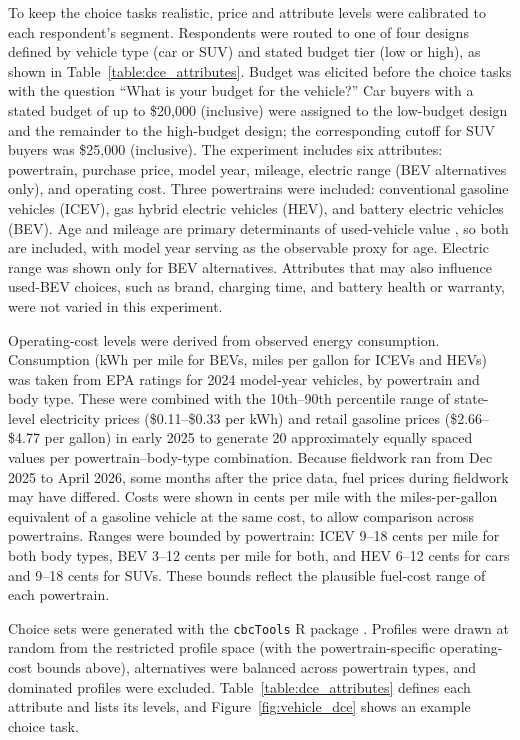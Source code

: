 \documentclass[a4paper,fleqn]{cas-sc}   %
\begin{document}
To keep the choice tasks realistic, price and attribute levels were calibrated to each respondent's segment. Respondents were routed to one of four designs defined by vehicle type (car or SUV) and stated budget tier (low or high), as shown in Table~\ref{table:dce_attributes}. Budget was elicited before the choice tasks with the question ``What is your budget for the vehicle?'' Car buyers with a stated budget of up to \$20,000 (inclusive) were assigned to the low-budget design and the remainder to the high-budget design; the corresponding cutoff for SUV buyers was \$25,000 (inclusive). The experiment includes six attributes: powertrain, purchase price, model year, mileage, electric range (BEV alternatives only), and operating cost. Three powertrains were included: conventional gasoline vehicles (ICEV), gas hybrid electric vehicles (HEV), and battery electric vehicles (BEV). Age and mileage are primary determinants of used-vehicle value \parencite{prieto2015}, so both are included, with model year serving as the observable proxy for age. Electric range was shown only for BEV alternatives. Attributes that may also influence used-BEV choices, such as brand, charging time, and battery health or warranty, were not varied in this experiment.

Operating-cost levels were derived from observed energy consumption. Consumption (kWh per mile for BEVs, miles per gallon for ICEVs and HEVs) was taken from EPA ratings for 2024 model-year vehicles, by powertrain and body type. These were combined with the 10th--90th percentile range of state-level electricity prices (\$0.11--\$0.33 per kWh) and retail gasoline prices (\$2.66--\$4.77 per gallon) in early 2025 to generate 20 approximately equally spaced values per powertrain--body-type combination. Because fieldwork ran from Dec 2025 to April 2026, some months after the price data, fuel prices during fieldwork may have differed. Costs were shown in cents per mile with the miles-per-gallon equivalent of a gasoline vehicle at the same cost, to allow comparison across powertrains. Ranges were bounded by powertrain: ICEV 9--18 cents per mile for both body types, BEV 3--12 cents per mile for both, and HEV 6--12 cents for cars and 9--18 cents for SUVs. These bounds reflect the plausible fuel-cost range of each powertrain.

Choice sets were generated with the \texttt{cbcTools} R package \parencite{helvestonCbcToolsDesignAnalyze2025}. Profiles were drawn at random from the restricted profile space (with the powertrain-specific operating-cost bounds above), alternatives were balanced across powertrain types, and dominated profiles were excluded. Table~\ref{table:dce_attributes} defines each attribute and lists its levels, and Figure~\ref{fig:vehicle_dce} shows an example choice task.
\end{document}
